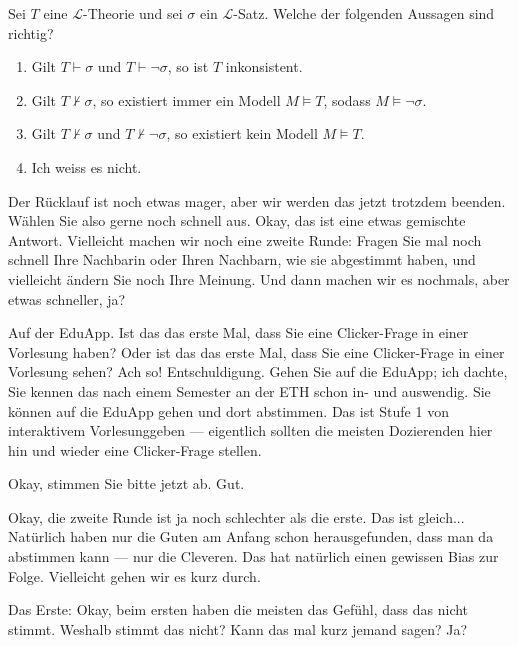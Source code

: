 \begin{nice-box}
\begin{math-stroke}
Sei $T$ eine $\mathcal{L}$-Theorie und sei $\sigma$ ein $\mathcal{L}$-Satz. Welche der folgenden Aussagen sind richtig?
\begin{enumerate}[label=\textbf{(\arabic*)}]
    \item Gilt $T \vdash \sigma$ und $T \vdash \neg\sigma$, so ist $T$ inkonsistent.
    \item Gilt $T \not\vdash \sigma$, so existiert immer ein Modell $M \models T$, sodass $M \models \neg\sigma$.
    \item Gilt $T \not\vdash \sigma$ und $T \not\vdash \neg\sigma$, so existiert kein Modell $M \models T$.
    \item Ich weiss es nicht.
\end{enumerate}
\end{math-stroke}
\end{nice-box}

\begin{spoken-clean}[00:01:21 - 00:02:08]
Der Rücklauf ist noch etwas mager, aber wir werden das jetzt trotzdem beenden. Wählen Sie also gerne noch schnell aus. Okay, das ist eine etwas gemischte Antwort. Vielleicht machen wir noch eine zweite Runde: Fragen Sie mal noch schnell Ihre Nachbarin oder Ihren Nachbarn, wie sie abgestimmt haben, und vielleicht ändern Sie noch Ihre Meinung. Und dann machen wir es nochmals, aber etwas schneller, ja?

Auf der EduApp. Ist das das erste Mal, dass Sie eine Clicker-Frage in einer Vorlesung haben? Oder ist das das erste Mal, dass Sie eine Clicker-Frage in einer Vorlesung sehen? Ach so! Entschuldigung. Gehen Sie auf die EduApp; ich dachte, Sie kennen das nach einem Semester an der ETH schon in- und auswendig. Sie können auf die EduApp gehen und dort abstimmen. Das ist Stufe 1 von interaktivem Vorlesunggeben --- eigentlich sollten die meisten Dozierenden hier hin und wieder eine Clicker-Frage stellen.

Okay, stimmen Sie bitte jetzt ab. Gut.
\end{spoken-clean}

\begin{spoken-clean}[00:02:08 - 00:03:18]
Okay, die zweite Runde ist ja noch schlechter als die erste. Das ist gleich... Natürlich haben nur die Guten am Anfang schon herausgefunden, dass man da abstimmen kann --- nur die Cleveren. Das hat natürlich einen gewissen Bias zur Folge. Vielleicht gehen wir es kurz durch.

Das Erste: Okay, beim ersten haben die meisten das Gefühl, dass das nicht stimmt. Weshalb stimmt das nicht? Kann das mal kurz jemand sagen? Ja?
\end{spoken-clean}

